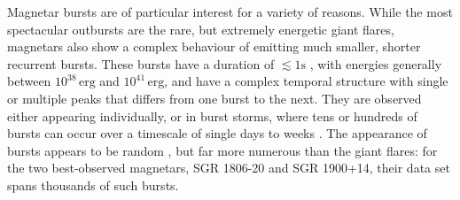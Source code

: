 \documentclass[12pt]{emulateapj}
\begin{document}

Magnetar bursts are of particular interest for a variety of reasons. While the most spectacular outbursts are the rare, but extremely energetic giant flares,
magnetars also show a complex behaviour of emitting much smaller, shorter recurrent bursts. These bursts have a duration of $\lesssim 1\mathrm{s}$ , with energies
generally between $10^{38}\,\mathrm{erg}$ and $10^{41}\,\mathrm{erg}$, and have a complex temporal structure with single or
multiple peaks that differs from one burst to the next. They are observed either appearing individually, or in burst 
storms, where tens or hundreds of bursts can occur over a timescale of single days to weeks \citep{mazets1999,goetz2006b,israel2008,mereghetti2009,savchenko2010,israel2010,scholz2011,dib2012,vanderhorst2012,vonkienlin2012}. 
The appearance of bursts appears to be random \citep{gogus1999,gogus2000}, but far more numerous than the giant flares: 
for the two best-observed magnetars, SGR 1806-20 and SGR 1900+14, their
data set spans thousands of such bursts. 
\end{document}
